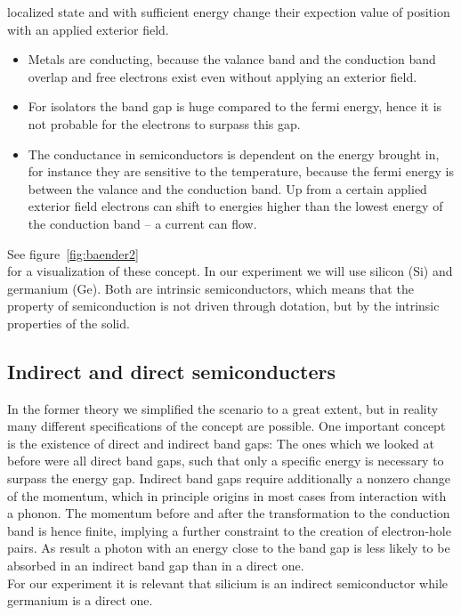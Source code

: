 localized state and with sufficient energy change their expection value of position with an applied
exterior field.
\begin{itemize}
    \item Metals are conducting, because the valance band and the conduction band overlap and 
        free electrons exist even without applying an exterior field.
    \item For isolators the band gap is huge compared to the fermi energy, hence it is not probable for
        the electrons to surpass this gap.
    \item The conductance in semiconductors is dependent on the energy brought in, for instance they
        are sensitive to the temperature, because the fermi energy is between the valance and the
        conduction band. Up from a certain applied exterior field electrons can shift to energies
        higher than the lowest energy of the conduction band -- a current can flow.
\end{itemize}

See figure~\ref{fig:baender2} \cite{demtroder2000experimentalphysik}\\ for
a visualization of these concept.
In our experiment we will use silicon (Si) and germanium (Ge). 
Both are intrinsic semiconductors, which means that the property of semiconduction is not 
driven through dotation, but by the intrinsic properties of the solid.
\subsection{Indirect and direct semiconducters}
In the former theory we simplified the scenario to a great extent, but in reality many 
different specifications of the concept are possible. One important concept is the existence
of direct and indirect band gaps: The ones which we looked at before were all direct band gaps, such
that only a specific energy is necessary to surpass the energy gap. Indirect band gaps require additionally 
a nonzero change of the momentum, which in principle origins in most cases from interaction with a phonon.
The momentum before and after the transformation to the conduction band is hence finite, implying
a further constraint to the creation of electron-hole pairs. As result a photon with an energy close to
the band gap is less likely to be absorbed in an indirect band gap than in a direct one. \\
For our experiment it is relevant that silicium is an indirect semiconductor while germanium is a direct one. 

